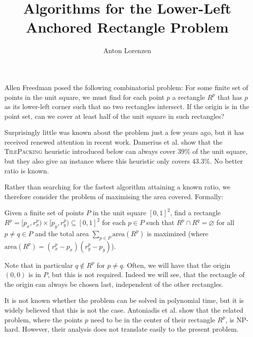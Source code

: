 \documentclass[11pt, a4paper, twocolumn]{article}
\begin{document}
\title{\texorpdfstring{\vspace{-0.5cm}}{}Algorithms for the Lower-Left Anchored Rectangle Problem}
\author{Anton Lorenzen}
\date{}

\maketitle

Allen Freedman \cite[p.~345]{tutte1969recent} posed the following combinatorial problem:
For some finite set of points in the unit square, we must find for each point $p$
a rectangle $R^p$ that has $p$ as its lower-left corner such that no two rectangles intersect.
If the origin is in the point set, can we cover at least half of the unit square in such rectangles?

Surprisingly little was known about the problem just a few years ago,
but it has received renewed attention in recent work.
Damerius et al. \cite{damerius2021greedily} show that the \textsc{TilePacking} heuristic
introduced below can always
cover 39\% of the unit square, but they also give an instance where this heuristic only
covers 43.3\%. No better ratio is known.

Rather than searching for the fastest algorithm attaining a known ratio, we therefore
consider the problem of maximising the area covered. Formally:

\begin{definition}
    Given a finite set of points $P$ in the unit square $[0,1]^2$,
    find a rectangle $R^p = [p_x, r^p_x) \times [p_y, r^p_y) \subseteq [0,1]^2$ for each $p \in P$
    such that $R^p \cap R^q = \varnothing$ for all $p \neq q \in P$
    and the total area $\sum_{p\in P} \text{area}(R^p)$ is maximized (where $\text{area}(R^p) = (r^p_x - p_x)(r^p_y - p_y)$).
\end{definition}

Note that in particular $q \notin R^p$ for $p\neq q$.
Often, we will have that the origin $(0,0)$ is in $P$, but this is not required.
Indeed we will see, that the rectangle of the origin can always be chosen last, independent of
the other rectangles.

It is not known whether the problem can be solved in polynomial time,
but it is widely believed that this is not the case.
Antoniadis et al. \cite{antoniadis2019complexity} show that the related problem,
where the points $p$ need to be in the center of their rectangle $R^p$, is NP-hard.
However, their analysis does not translate easily to the present problem.
\end{document}
